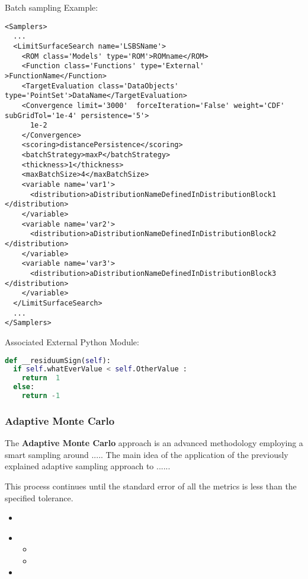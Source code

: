 Batch sampling Example:
\begin{lstlisting}[style=XML,morekeywords={class,limit,subGridTol,weight,persistence}]
<Samplers>
  ...
  <LimitSurfaceSearch name='LSBSName'>
    <ROM class='Models' type='ROM'>ROMname</ROM>
    <Function class='Functions' type='External' >FunctionName</Function>
    <TargetEvaluation class='DataObjects' type='PointSet'>DataName</TargetEvaluation>
    <Convergence limit='3000'  forceIteration='False' weight='CDF'  subGridTol='1e-4' persistence='5'>
      1e-2
    </Convergence>
    <scoring>distancePersistence</scoring>
    <batchStrategy>maxP</batchStrategy>
    <thickness>1</thickness>
    <maxBatchSize>4</maxBatchSize>
    <variable name='var1'>
      <distribution>aDistributionNameDefinedInDistributionBlock1 </distribution>
    </variable>
    <variable name='var2'>
      <distribution>aDistributionNameDefinedInDistributionBlock2 </distribution>
    </variable>
    <variable name='var3'>
      <distribution>aDistributionNameDefinedInDistributionBlock3 </distribution>
    </variable>
  </LimitSurfaceSearch>
  ...
</Samplers>
\end{lstlisting}

Associated External Python Module:
\begin{lstlisting}[language=python]
def __residuumSign(self):
  if self.whatEverValue < self.OtherValue :
    return  1
  else:
    return -1
\end{lstlisting}

\subsubsection{Adaptive Monte Carlo}
\label{subsubsubsec:ADMC}
The \textbf{Adaptive Monte Carlo} approach is an advanced methodology
employing a smart sampling around .....
%
The main idea of the application of the previously explained adaptive sampling
approach to ......

This process continues until the standard error of all the metrics is less than the specified tolerance.
%

%
\begin{itemize}
  \itemsep0em
  \item \nameDescription
\end{itemize}

\begin{itemize}
\item \variableDescription
  \variableChildrenIntro
  \begin{itemize}
    \item \distributionDescription
    \item \functionDescription
  \end{itemize}
  \item \constantVariablesDescription
\end{itemize}

